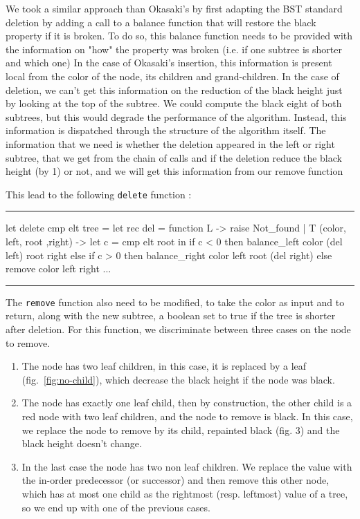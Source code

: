 \documentclass[10pt,a4paper]{article}
\newcommand{\code}{\texttt}
\newenvironment{codeblock}%
{\center \minipage{\textwidth} \vspace{6pt} \hrule \vspace{6pt} \minted{ocaml}}%
{\endminted \hrule \vspace{6pt} \endminipage \endcenter}
\begin{document}
We took a similar approach than Okasaki's by first adapting the BST standard deletion by adding a call to a balance function that will restore the black property if it is broken.
To do so, this balance function needs to be provided with the information on "how" the property was broken (i.e. if one subtree is shorter and which one)
In the case of Okasaki's insertion, this information is present local from the color of the node, its children and grand-children. In the case of deletion, we can't get this information on the reduction of the black height just by looking at the top of the subtree.
We could compute the black eight of both subtrees, but this would degrade the performance of the algorithm.
Instead, this information is dispatched through the structure of the algorithm itself.
The information that we need is whether the deletion appeared in the left or right subtree, that we get from the chain of calls and if the deletion reduce the black height (by 1) or not, and we will get this information from our remove function


This lead to the following \code{delete} function :
\begin{codeblock}
   let delete cmp elt tree =
   let rec del = function
   L -> raise Not_found
   | T (color, left, root ,right) ->
   let c = cmp elt root in
   if c < 0 then balance_left color (del left) root right
   else if c > 0 then balance_right color left root (del right)
   else remove color left right
   ...
\end{codeblock}

The \code{remove} function also need to be modified, to take the color as input and to return, along with the new subtree, a boolean set to true if the tree is shorter after deletion.
For this function, we discriminate between three cases on the node to remove.

\begin{enumerate}
   \item The node has two leaf children, in this case, it is replaced by a leaf (fig.~\ref{fig:no-child}), which decrease the black height if the node was black.
   \item The node has exactly one leaf child, then by construction, the other child is a red node with two leaf children, and the node to remove is black. In this case, we replace the node to remove by its child, repainted black (fig. 3) and the black height doesn't change.
   \item In the last case the node has two non leaf children. We replace the value with the in-order predecessor (or successor) and then remove this other node, which has at most one child as the rightmost (resp. leftmost) value of a tree, so we end up with one of the previous cases.
\end{enumerate}
\end{document}
